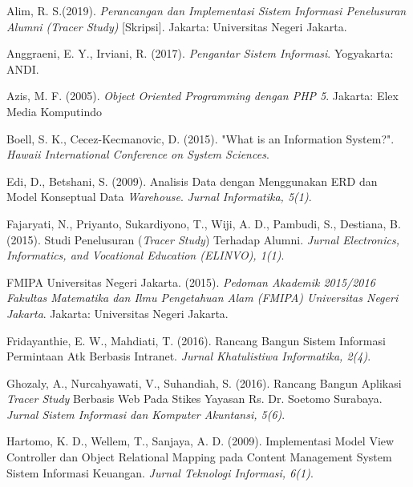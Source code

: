 \documentclass{jtetiskripsi}
\begin{document}
%
\begin{thebibliography}{99}
	
 Alim, R. S.(2019). \textit{Perancangan dan Implementasi Sistem Informasi Penelusuran Alumni (Tracer Study)} [Skripsi]. Jakarta: Universitas Negeri Jakarta.

 Anggraeni, E. Y., Irviani, R. (2017). \textit{Pengantar Sistem Informasi}. Yogyakarta: ANDI.

 Azis, M. F. (2005). \textit{Object Oriented Programming dengan PHP 5}. Jakarta: Elex Media Komputindo

 Boell, S. K., Cecez-Kecmanovic, D. (2015). "What is an Information System?". \textit{Hawaii International Conference on System Sciences}.

 Edi, D., Betshani, S. (2009). Analisis Data dengan Menggunakan ERD dan Model Konseptual Data \textit{Warehouse}. \textit{Jurnal Informatika, 5(1)}.

 Fajaryati, N., Priyanto, Sukardiyono, T., Wiji, A. D., Pambudi, S., Destiana, B. (2015). Studi Penelusuran (\textit{Tracer Study}) Terhadap Alumni. \textit{Jurnal Electronics, Informatics, and Vocational Education (ELINVO), 1(1)}.

 FMIPA Universitas Negeri Jakarta. (2015). \textit{Pedoman Akademik 2015/2016 Fakultas Matematika dan Ilmu Pengetahuan Alam (FMIPA) Universitas Negeri Jakarta}. Jakarta: Universitas Negeri Jakarta.

 Fridayanthie, E. W., Mahdiati, T. (2016). Rancang Bangun Sistem Informasi Permintaan Atk Berbasis Intranet. \textit{Jurnal Khatulistiwa Informatika, 2(4)}.

 Ghozaly, A., Nurcahyawati, V., Suhandiah, S. (2016). Rancang Bangun Aplikasi \textit{Tracer Study} Berbasis Web Pada Stikes Yayasan Rs. Dr. Soetomo Surabaya. \textit{Jurnal Sistem Informasi dan Komputer Akuntansi, 5(6)}.

 Hartomo, K. D., Wellem, T., Sanjaya, A. D. (2009). Implementasi Model View Controller dan Object Relational Mapping pada Content Management System Sistem Informasi Keuangan. \textit{Jurnal Teknologi Informasi, 6(1)}.


\end{thebibliography}
\end{document}
